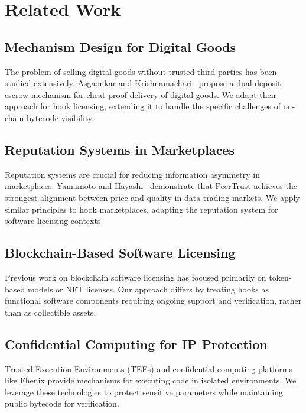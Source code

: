 \documentclass[11pt,a4paper]{article}
\theoremstyle{definition}
\theoremstyle{remark}
\begin{document}

\section{Related Work}
\label{sec:related}

\subsection{Mechanism Design for Digital Goods}

The problem of selling digital goods without trusted third parties has been studied extensively. Asgaonkar and Krishnamachari~\cite{asgaonkar2018} propose a dual-deposit escrow mechanism for cheat-proof delivery of digital goods. We adapt their approach for hook licensing, extending it to handle the specific challenges of on-chain bytecode visibility.

\subsection{Reputation Systems in Marketplaces}

Reputation systems are crucial for reducing information asymmetry in marketplaces. Yamamoto and Hayashi~\cite{yamamoto2025} demonstrate that PeerTrust achieves the strongest alignment between price and quality in data trading markets. We apply similar principles to hook marketplaces, adapting the reputation system for software licensing contexts.

\subsection{Blockchain-Based Software Licensing}

Previous work on blockchain software licensing has focused primarily on token-based models or NFT licenses. Our approach differs by treating hooks as functional software components requiring ongoing support and verification, rather than as collectible assets.

\subsection{Confidential Computing for IP Protection}

Trusted Execution Environments (TEEs) and confidential computing platforms like Fhenix provide mechanisms for executing code in isolated environments. We leverage these technologies to protect sensitive parameters while maintaining public bytecode for verification.
\end{document}
